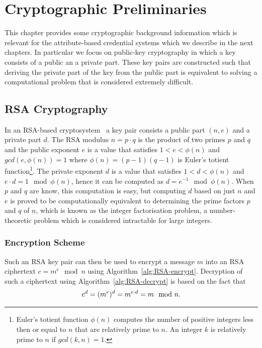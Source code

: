 \chapter{Cryptographic Preliminaries}

This chapter provides some cryptographic background information which is
relevant for the attribute-based credential systems which we describe in the
next chapters. In particular we focus on public-key cryptography in which a key
consists of a public an a private part. These key pairs are constructed such
that deriving the private part of the key from the public part is equivalent to
solving a computational problem that is considered extremely difficult.

\section{RSA Cryptography}

In an RSA-based cryptosystem~\cite{RSA1978} a key pair consists a public part
$(n, e)$ and a private part $d$. The RSA modulus $n = p \cdot q$ is the product
of two primes $p$ and $q$ and the public exponent $e$ is a value that satisfies
$1 < e < \phi(n)$ and $gcd(e, \phi(n)) = 1$ where $\phi(n) = (p-1)(q-1)$ is
Euler's totient function\footnote{Euler's totient function $\phi(n)$ computes
the number of positive integers less then or equal to $n$ that are relatively
prime to $n$. An integer $k$ is relatively prime to $n$ if $gcd(k, n) = 1$.}.
The private exponent $d$ is a value that satisfies $1 < d < \phi(n)$ and
$e \cdot d = 1 \mod \phi(n)$, hence it can be computed as
$d = e^{-1} \mod \phi(n)$. When $p$ and $q$ are know, this computation is easy,
but computing $d$ based on just $n$ and $e$ is proved to be computationally
equivalent to determining the prime factors $p$ and $q$ of $n$, which is known
as the integer factorisation problem, a number-theoretic problem which is
considered intractable for large integers.

\subsection{Encryption Scheme}

Such an RSA key pair can then be used to encrypt a message $m$ into an RSA
ciphertext $c = m^e \mod n$ using Algorithm~\ref{alg:RSA-encrypt}. Decryption
of such a ciphertext using Algorithm~\ref{alg:RSA-decrypt} is based on the fact
that
\begin{equation*}
  c^d = (m^e)^d = m^{e \cdot d} = m \mod n\text.
\end{equation*}

